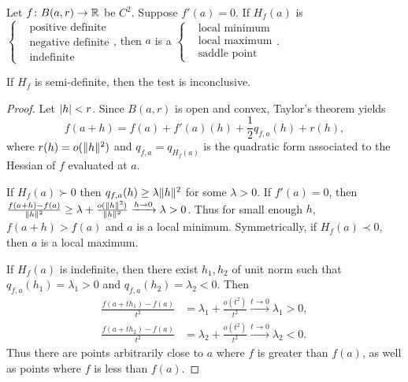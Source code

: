 \begin{proposition}
    Let $f\colon B(a, r) \to \mathbb{R}$ be $C^2$.
    Suppose $f'(a) = 0$.
    If $H_f(a)$ is $\left\{\begin{aligned}
        &\text{positive definite} \\
        &\text{negative definite} \\
        &\text{indefinite}
    \end{aligned}\right.$, then $a$ is a $\left\{\begin{aligned}
        &\text{local minimum} \\
        &\text{local maximum} \\
        &\text{saddle point}
    \end{aligned}\right.$.
\end{proposition}
If $H_f$ is semi-definite, then the test is inconclusive.
\begin{proof}
    Let $\lvert h\rvert < r$.
    Since $B(a, r)$ is open and convex, Taylor's theorem yields \[
        f(a + h) = f(a) + f'(a)(h) + \frac12 q_{f, a}(h) + r(h),
    \] where $r(h) = o(\lVert h\rVert^2)$ and $q_{f, a} = q_{H_f(a)}$ is the
    quadratic form associated to the Hessian of $f$ evaluated at $a$.

    If $H_f(a) \succ 0$ then $q_{f, a}(h) \ge \lambda \lVert h\rVert^2$ for some
    $\lambda > 0$.
    If $f'(a) = 0$, then $\frac{f(a+h) - f(a)}{\lVert h\rVert^2} \ge \lambda +
    \frac{o(\lVert h\rVert^2)}{\lVert h\rVert^2} \xrightarrow{h \to 0} \lambda > 0$.
    Thus for small enough $h$, $f(a + h) > f(a)$ and $a$ is a local minimum.
    Symmetrically, if $H_f(a) \prec 0$, then $a$ is a local maximum.

    If $H_f(a)$ is indefinite, then there exist $h_1, h_2$ of unit norm such
    that $q_{f, a}(h_1) = \lambda_1 > 0$ and
    $q_{f, a}(h_2) = \lambda_2 < 0$.
    Then \begin{align*}
        \frac{f(a+th_1) - f(a)}{t^2}
            &= \lambda_1 + \frac{o(t^2)}{t^2}
                \xrightarrow{t \to 0} \lambda_1 > 0, \\
        \frac{f(a+th_2) - f(a)}{t^2}
            &= \lambda_2 + \frac{o(t^2)}{t^2}
                \xrightarrow{t \to 0} \lambda_2 < 0.
    \end{align*}
    Thus there are points arbitrarily close to $a$ where $f$ is greater than
    $f(a)$, as well as points where $f$ is less than $f(a)$.
\end{proof}
